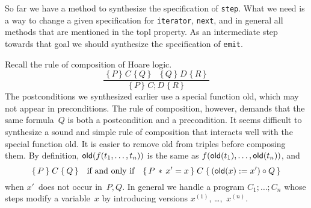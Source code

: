 \documentclass{article} %
\newcommand{\3}[3]{\{\,#1\,\}\;#2\;\{\,#3\,\}}
\newcommand{\infer}[2]{\frac{\displaystyle\;#1\;}{\displaystyle\;#2\;}}
\renewcommand{\*}{\,*\,}
\begin{document}
\medskip

So far we have a method to synthesize the specification of {\tt step}.
What we need is a way to change a given specification for {\tt iterator}, {\tt next}, and in general all methods that are mentioned in the topl property.
As an intermediate step towards that goal we should synthesize the specification of {\tt emit}.

Recall the rule of composition of Hoare logic.
\[\infer
  {\3{P}{C}{Q}\quad\3{Q}{D}{R}}
  {\3{P}{C;D}{R}}
\]
The postconditions we synthesized earlier use a special function {\sf old}, which may not appear in preconditions.
The rule of composition, however, demands that the same formula~$Q$ is both a postcondition and a precondition.
It seems difficult to synthesize a sound and simple rule of composition that interacts well with the special function {\sf old}.
It is easier to remove {\sf old} from triples before composing them.
By definition, ${\sf old}(f(t_1,\ldots,t_n))$ is the same as $f({\sf old}(t_1),\ldots,{\sf old}(t_n))$, and
\[
  \3{P}{C}{Q} \quad\text{if and only if}\quad
  \3{P\* x'=x}{C}{({\sf old}(x):=x')\circ Q}
\]
when $x'$~does not occur in~$P,Q$.
In general we handle a program $C_1;\ldots;C_n$ whose steps modify a variable~$x$ by introducing versions $x^{(1)}$, \dots,~$x^{(n)}$.
\end{document}
